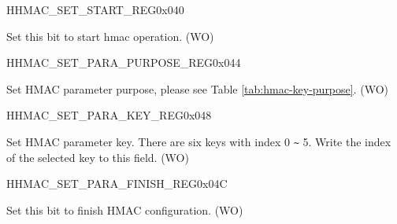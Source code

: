 \begin{register}{H}{HMAC\_SET\_START\_REG}{0x{}040}\label{regdesc:HMACSETSTARTREG}
%
%
\regnewline%
\begin{regdesc}\begin{reglist}
\label{fielddesc:HMACSETSTART}\item [HMAC\_SET\_START] Set this bit to start hmac operation. (WO)
\end{reglist}\end{regdesc}
\end{register}


\begin{register}{H}{HMAC\_SET\_PARA\_PURPOSE\_REG}{0x{}044}\label{regdesc:HMACSETPARAPURPOSEREG}
%
%
\regnewline%
\begin{regdesc}\begin{reglist}
\label{fielddesc:HMACPURPOSESET}\item [HMAC\_PURPOSE\_SET] Set HMAC parameter purpose, please see Table \ref{tab:hmac-key-purpose}. (WO)
\end{reglist}\end{regdesc}
\end{register}


\begin{register}{H}{HMAC\_SET\_PARA\_KEY\_REG}{0x{}048}\label{regdesc:HMACSETPARAKEYREG}
%
%
\regnewline%
\begin{regdesc}\begin{reglist}
\label{fielddesc:HMACKEYSET}\item [HMAC\_KEY\_SET] Set HMAC parameter key. There are six keys with index 0 \verb+~+ 5. Write the index of the selected key to this field. (WO)
\end{reglist}\end{regdesc}
\end{register}


\begin{register}{H}{HMAC\_SET\_PARA\_FINISH\_REG}{0x{}04C}\label{regdesc:HMACSETPARAFINISHREG}
%
%
\regnewline%
\begin{regdesc}\begin{reglist}
\label{fielddesc:HMACSETPARAEND}\item [HMAC\_SET\_PARA\_END] Set this bit to finish HMAC configuration. (WO)
\end{reglist}\end{regdesc}
\end{register}


